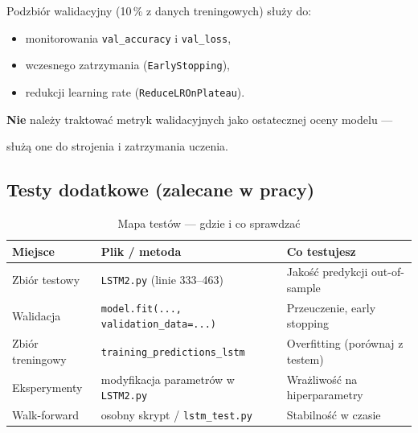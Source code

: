 \documentclass[12pt,a4paper]{report}
\begin{document}
Podzbiór walidacyjny (10\,\% z danych treningowych) służy do:

\begin{itemize}

    \item monitorowania \texttt{val\_accuracy} i \texttt{val\_loss},

    \item wczesnego zatrzymania (\texttt{EarlyStopping}),

    \item redukcji learning rate (\texttt{ReduceLROnPlateau}).

\end{itemize}

\textbf{Nie} należy traktować metryk walidacyjnych jako ostatecznej oceny modelu ---

służą one do strojenia i zatrzymania uczenia.



\subsection{Testy dodatkowe (zalecane w pracy)}



\begin{table}[H]

\centering

\caption{Mapa testów --- gdzie i co sprawdzać}

\label{tab:testy}

\begin{tabular}{@{}p{3.5cm}p{4cm}p{6cm}@{}}

\toprule

\textbf{Miejsce} & \textbf{Plik / metoda} & \textbf{Co testujesz} \\

\midrule

Zbiór testowy & \texttt{LSTM2.py} (linie 333--463) & Jakość predykcji out-of-sample \\

Walidacja & \texttt{model.fit(..., validation\_data=...)} & Przeuczenie, early stopping \\

Zbiór treningowy & \texttt{training\_predictions\_lstm} & Overfitting (porównaj z testem) \\

Eksperymenty & modyfikacja parametrów w \texttt{LSTM2.py} & Wrażliwość na hiperparametry \\

Walk-forward & osobny skrypt / \texttt{lstm\_test.py} & Stabilność w czasie \\

\bottomrule

\end{tabular}

\end{table}
\end{document}
